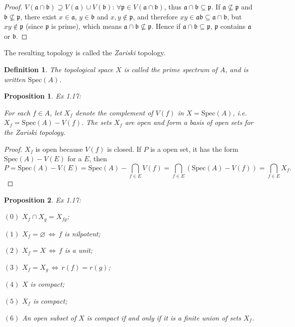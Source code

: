 \documentclass[11pt]{article}
\theoremstyle{plain}%
\newtheorem{pro}{Proposition}%
\newtheorem{defi}{Definition}%
\newcommand{\no}[1]{{$(#1)$}}  %
\newcommand{\fr}[1]{{\mathfrak{#1}}}
\begin{document}
\begin{proof}
	$V(\fr{a}\cap \fr{b})\supseteq V(\fr{a})\cup V(\fr{b})$: $\forall \fr{p}\in V(\fr{a}\cap \fr{b})$, thus $\fr{a}\cap \fr{b}\subseteq \fr{p}$. If $\fr{a}\nsubseteq \fr{p}$ and $\fr{b}\nsubseteq \fr{p}$, there exist $x\in \fr{a}$, $y\in \fr{b}$ and $x,y \notin \fr{p}$, and therefore $xy\in \fr{a}\fr{b}\subseteq \fr{a}\cap \fr{b}$, but $xy \notin \fr{p}$ (since $\fr{p}$ is prime), which means $\fr{a}\cap \fr{b}\nsubseteq \fr{p}$. Hence if $\fr{a}\cap \fr{b}\subseteq \fr{p}$, $\fr{p}$ contains $\fr{a}$ or $\fr{b}$.
\end{proof}

The resulting topology is called the \textit{Zariski} topology.
\begin{defi}
	The topological space $X$ is called the prime spectrum of $A$, and is written $\mathrm{Spec}(A)$.
\end{defi}

\begin{pro}{\rm Ex 1.17}:

	For each $f\in A$, let $X_f$ denote the complement of $V(f)$ in $X=\mathrm{Spec}(A)$, i.e. $X_f=\mathrm{Spec}(A)-V(f)$. The sets $X_f$ are open and form a basis of open sets for the Zariski topology.
\end{pro}

\begin{proof}
	$X_f$ is open because $V(f)$ is closed. If $P$ is a open set, it has the form $\mathrm{Spec}(A)-V(E)$ for a $E$, then
	\[
		P=\mathrm{Spec}(A)-V(E)=\mathrm{Spec}(A)-\bigcap_{f\in E}V\left(f\right)=\bigcap_{f\in E} \left(\mathrm{Spec}(A)-V\left(f\right)\right)=\bigcap_{f\in E} X_f.
	\]
\end{proof}

\begin{pro}{\rm Ex 1.17}:

	\no{0} $X_f\cap X_g=X_{fg}$;

	\no{1} $X_f=\varnothing \, \Leftrightarrow\, f$ is nilpotent;

	\no{2} $X_f=X \, \Leftrightarrow\, f$ is a unit;

	\no{3} $X_f=X_g \, \Leftrightarrow\, r(f)=r(g)$;

	\no{4} $X$ is compact;

	\no{5} $X_f$ is compact;

	\no{6} An open subset of $X$ is compact if and only if it is a finite union of sets $X_f$.
\end{pro}
\end{document}
